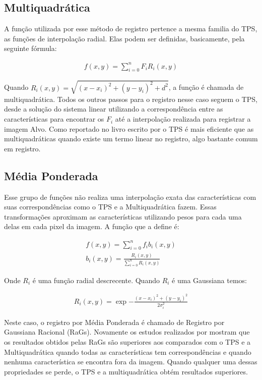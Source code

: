 \subsection{Multiquadrática}
  A função utilizada por esse método de registro pertence a mesma familia do TPS, as funções de interpolação radial.
Elas podem ser definidas, basicamente, pela seguinte fórmula:

\begin{align}\label{math:multiquadric}
    f(x,y) = \sum_{i=0}^n F_i R_i(x,y)
\end{align}

  Quando $R_i(x,y) = \sqrt{(x-x_i)^2 + (y-y_i)^2 + d^2}$, a função é chamada de multiquadrática. Todos os outros passos
para o registro nesse caso seguem o TPS, desde a solução do sistema linear utilizando a correspondência entre as
características para encontrar os $F_i$ até a interpolação realizada para registrar a imagem Alvo. Como reportado
no livro escrito por \cite{goshtasby2005} o TPS é mais eficiente que as multiquadráticas quando existe um termo linear
no registro, algo bastante comum em registro.

\subsection{Média Ponderada}
  Esse grupo de funções não realiza uma interpolação exata das características com suas correspondências como o TPS e
a Multiquadrática fazem. Essas transformações aproximam as características utilizando pesos para cada uma delas em
cada pixel da imagem. A função que a define é:

\begin{align}\label{math:multiquadric}
    f(x,y) = \sum_{i=0}^n f_i b_i(x,y) \\
    b_i(x,y) = \frac{R_i(x,y)}{\sum_{i=0}^n R_i(x,y)}
\end{align}

  Onde $R_i$ é uma função radial descrecente. Quando $R_i$ é uma Gaussiana temos:

\begin{align}\label{math:multiquadric}
    R_i(x,y) = \exp{-\frac{(x-x_i)^2 + (y - y_i)^2}{2\sigma_i^2}}
\end{align}

  Neste caso, o registro por Média Ponderada é chamado de Registro por Gaussiana Racional (RaGs). Novamente os estudos
realizados por \cite{goshtasby2005} mostram que os resultados obtidos pelas RaGs são superiores aos comparados com
o TPS e a Multiquadrática quando todas as características tem correspondências e quando nenhuma característica se encontra
fora da imagem. Quando qualquer uma dessas propriedades se perde, o TPS e a multiquadrática obtém resultados superiores.
